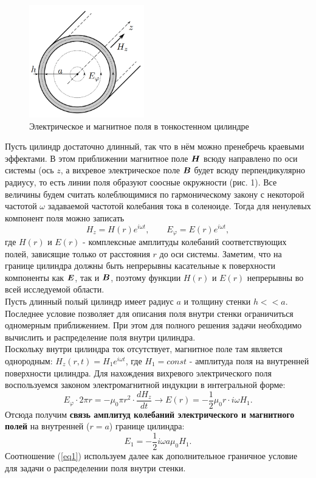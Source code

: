 \documentclass[a4paper,12pt]{article}
\theoremstyle{plain} %
\theoremstyle{definition} %
\theoremstyle{remark} %
\begin{document}
		\begin{figure}
		\includegraphics[width=5cm]{cylinder.png}
		\caption{Электрическое и магнитное поля в тонкостенном цилиндре}
		\label{pic:2}
	\end{figure}
	\indent Пусть цилиндр достаточно длинный, так что в нём можно пренебречь краевыми эффектами. В этом приближении магнитное поле $\vb*{H}$ всюду направлено по оси системы (ось $z$, а вихревое электрическое поле $\vb*{B}$ будет всюду перпендикулярно радиусу, то есть линии поля образуют соосные окружности (рис. 1). Все величины будем считать колеблющимися по гармоническому закону с некоторой частотой $\omega$ задаваемой частотой колебания тока в соленоиде. Тогда для ненулевых компонент поля можно записать
	\begin{equation*}
		H_z = H(r) e^{i \omega t}, \qquad E_{\varphi} = E(r) e^{i \omega t},
	\end{equation*}
	где $H(r)$ и $E(r)$ - комплексные амплитуды колебаний соответствующих полей, зависящие только от расстояния $r$ до оси системы. Заметим, что на границе цилиндра должны быть непрерывны касательные к поверхности компоненты как $\vb*{E}$, так и $\vb*{B}$, поэтому функции $H(r)$ и $E(r)$ непрерывны во всей исследуемой области.\\
	\indent Пусть длинный полый цилиндр имеет радиус $a$ и толщину стенки $h << a$. Последнее условие позволяет для описания поля внутри стенки ограничиться одномерным приближением. При этом для полного решения задачи необходимо вычислить и распределение поля внутри цилиндра.\\
	\indent Поскольку внутри цилиндра ток отсутствует, магнитное поле там является однородным: $H_z (r, t) = H_1 e^{i \omega t}$, где $H_1 = const$ - амплитуда поля на внутренней поверхности цилиндра. Для нахождения вихревого электрического поля
	воспользуемся законом электромагнитной индукции в интегральной форме:
	\begin{equation*}
		E_{\varphi} \cdot 2 \pi r = - \mu_0 \pi r^2 \cdot \frac{dH_z}{dt} \longrightarrow E(r) = -\frac{1}{2} \mu_0 r \cdot i \omega H_1.
	\end{equation*}
	\indent Отсюда получим \textbf{связь амплитуд колебаний электрического и магнитного полей} на внутренней ($r = a$) границе цилиндра:
	\begin{equation}\label{eq1}
		E_1 = -\frac{1}{2} i \omega a \mu_0 H_1.
	\end{equation}
	\indent Соотношение (\ref{eq1}) используем далее как дополнительное граничное условие для задачи о распределении поля внутри стенки.
	
\end{document}
